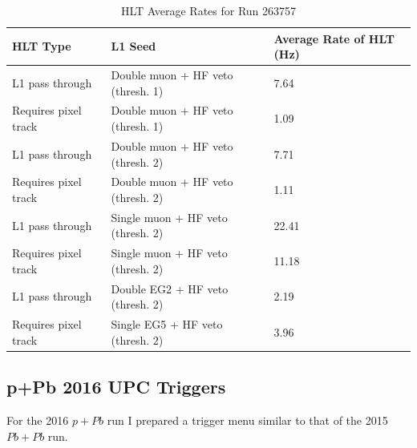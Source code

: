 \begin{table}[h!]
\centering
\caption{HLT Average Rates for Run 263757}
\label{my-label}
\begin{tabular}{@{}lll@{}}
\toprule
HLT Type             & L1 Seed                           & Average Rate of HLT (Hz) \\ \midrule
L1 pass through      & Double muon + HF veto (thresh. 1) & 7.64                     \\
Requires pixel track & Double muon + HF veto (thresh. 1) & 1.09                     \\
L1 pass through      & Double muon + HF veto (thresh. 2) & 7.71                     \\
Requires pixel track & Double muon + HF veto (thresh. 2) & 1.11                     \\
L1 pass through      & Single muon + HF veto (thresh. 2) & 22.41                    \\
Requires pixel track & Single muon + HF veto (thresh. 2) & 11.18                    \\
L1 pass through      & Double EG2 + HF veto (thresh. 2)  & 2.19                     \\
Requires pixel track & Single EG5 + HF veto (thresh. 2)  & 3.96                     \\ \bottomrule
\end{tabular}
\end{table}

\subsection{p+Pb 2016 UPC Triggers}

For the 2016 $p+Pb$ run I prepared a trigger menu similar to that of the 2015 $Pb+Pb$ run.

